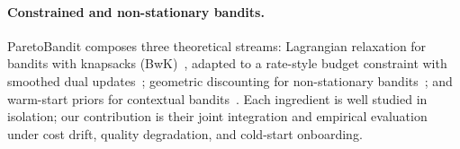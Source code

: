 \vspace{-4pt}
\paragraph{Constrained and non-stationary bandits.}
ParetoBandit composes three theoretical streams: Lagrangian relaxation for bandits with knapsacks (BwK)~\cite{badanidiyuru2013bwk, agrawal2016linear}, adapted to a rate-style budget constraint with smoothed dual updates~\cite{balseiro2019learning}; geometric discounting for non-stationary bandits~\cite{garivier2011switching, russac2019weighted}; and warm-start priors for contextual bandits~\cite{oetomo2023warmstart, pan2024cbli}. Each ingredient is well studied in isolation; our contribution is their joint integration and empirical evaluation under cost drift, quality degradation, and cold-start onboarding.
\par\endgroup
